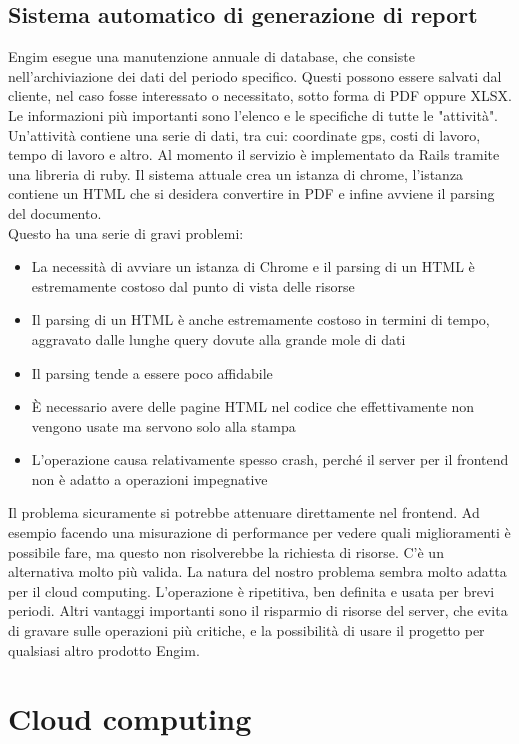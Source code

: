 \documentclass[12pt]{article}
\begin{document}
\subsection{Sistema automatico di generazione di report}
Engim esegue una manutenzione annuale di database, che consiste nell'archiviazione
dei dati del periodo specifico.
Questi possono essere salvati dal cliente, nel caso fosse interessato 
o necessitato, sotto forma di PDF oppure XLSX.
\\ 
Le informazioni più importanti sono l'elenco e le specifiche di tutte le "attività". 
Un'attività contiene una serie di dati, tra cui: coordinate
gps, costi di lavoro, tempo di lavoro e altro.  
Al momento il servizio è implementato da Rails tramite una libreria di ruby. 
Il sistema attuale crea un istanza di chrome, l'istanza contiene un HTML
che si desidera convertire in PDF e infine avviene il parsing del documento.
\\ Questo ha una serie di gravi problemi:
\begin{itemize}
  \item La necessità di avviare un istanza di Chrome e il parsing di un HTML è
  estremamente costoso dal punto di vista delle risorse
  \item Il parsing di un HTML è anche estremamente costoso in termini di tempo,
  aggravato dalle lunghe query dovute alla grande mole di dati 
  \item Il  parsing tende a essere poco affidabile
  \item È necessario avere delle pagine HTML nel codice che effettivamente 
  non vengono usate ma servono solo alla stampa 
  \item L'operazione causa relativamente spesso crash, perché il server 
  per il frontend non è adatto a operazioni impegnative
\end{itemize}
Il problema sicuramente si potrebbe attenuare direttamente nel frontend. 
Ad esempio facendo una misurazione di performance per vedere quali 
miglioramenti è possibile fare, ma questo non risolverebbe la richiesta di risorse. 
C'è un alternativa molto più valida.
La natura del nostro problema sembra molto adatta per il cloud computing.
L'operazione è ripetitiva, ben definita e usata per brevi periodi. Altri vantaggi 
importanti sono il risparmio di risorse del server, che evita di gravare sulle 
operazioni più critiche, e la possibilità di usare il progetto per qualsiasi 
altro prodotto Engim.

\section{Cloud computing}
\end{document}
